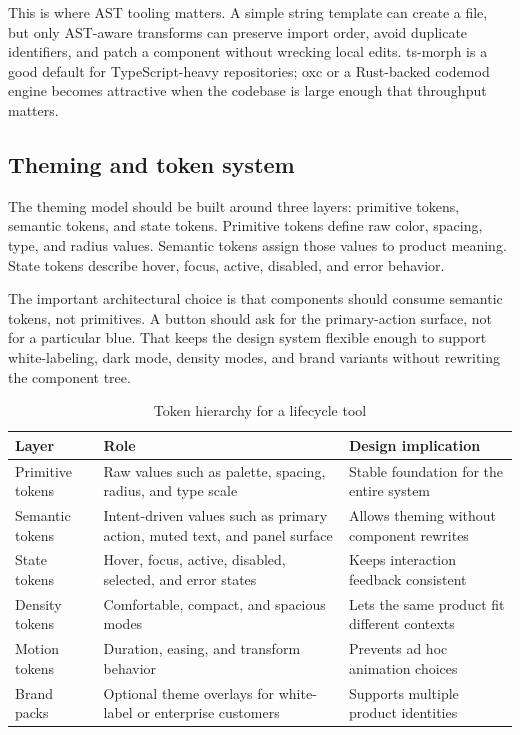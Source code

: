 \documentclass[11pt,twoside,a4paper]{article}
\begin{document}
This is where AST tooling matters. A simple string template can create a file, but only AST-aware transforms can preserve import order, avoid duplicate identifiers, and patch a component without wrecking local edits. ts-morph is a good default for TypeScript-heavy repositories; oxc or a Rust-backed codemod engine becomes attractive when the codebase is large enough that throughput matters.

\subsection{Theming and token system}
The theming model should be built around three layers: primitive tokens, semantic tokens, and state tokens. Primitive tokens define raw color, spacing, type, and radius values. Semantic tokens assign those values to product meaning. State tokens describe hover, focus, active, disabled, and error behavior.

The important architectural choice is that components should consume semantic tokens, not primitives. A button should ask for the primary-action surface, not for a particular blue. That keeps the design system flexible enough to support white-labeling, dark mode, density modes, and brand variants without rewriting the component tree.

\begin{table}[htbp]
  \centering
  \caption{Token hierarchy for a lifecycle tool}
  \begin{tabularx}{\textwidth}{@{}p{}p{}Y@{}}
    \toprule
    \textbf{Layer} & \textbf{Role} & \textbf{Design implication} \\
    \midrule
    Primitive tokens & Raw values such as palette, spacing, radius, and type scale & Stable foundation for the entire system \\
    Semantic tokens & Intent-driven values such as primary action, muted text, and panel surface & Allows theming without component rewrites \\
    State tokens & Hover, focus, active, disabled, selected, and error states & Keeps interaction feedback consistent \\
    Density tokens & Comfortable, compact, and spacious modes & Lets the same product fit different contexts \\
    Motion tokens & Duration, easing, and transform behavior & Prevents ad hoc animation choices \\
    Brand packs & Optional theme overlays for white-label or enterprise customers & Supports multiple product identities \\
    \bottomrule
  \end{tabularx}
\end{table}
\end{document}
